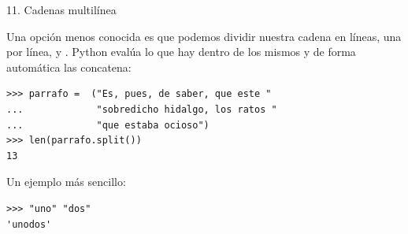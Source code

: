 \documentclass[14pt]{beamer}
\begin{document}
\begin{frame}[fragile]{11. Cadenas multilínea}

  \begin{alertblock}{}
    \small
    \centering
    Una opción menos conocida es que podemos dividir nuestra cadena en
    líneas, una por línea, y .
    Python evalúa lo que hay dentro de los mismos y de forma
    automática las concatena:
   \end{alertblock}

  \begin{exampleblock}{}
    \scriptsize
    \begin{lstlisting}
>>> parrafo =  ("Es, pues, de saber, que este "
...             "sobredicho hidalgo, los ratos "
...             "que estaba ocioso")
>>> len(parrafo.split())
13
    \end{lstlisting}
  \end{exampleblock}

  \small
  \begin{exampleblock}
    {Un ejemplo más sencillo:}
    \begin{lstlisting}
>>> "uno" "dos"
'unodos'
    \end{lstlisting}
  \end{exampleblock}
\end{frame}
\end{document}
